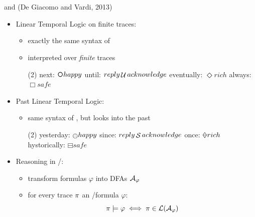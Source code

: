 \documentclass{beamer}
\begin{document}
\section{\LTLfToDFA}
\begin{frame}{\PLTL and \LTLf (De Giacomo and Vardi, 2013)}
	\begin{itemize}
		\item Linear Temporal Logic on finite traces: \LTLf
			\begin{itemize}
				\item exactly the same syntax of \LTL
				\item interpreted over \textit{finite} traces
	
			\begin{tasks}[counter-format = -](2)
				\task next: $\Next happy$
				\task until: $reply \mathop{\mathcal{U}} acknowledge$
				\task eventually: $\Diamond rich$
				\task always: $\Box safe$
			\end{tasks}
			
			\end{itemize}

		\item Past Linear Temporal Logic: \PLTL
			\begin{itemize}
				\item same syntax of \LTLf, but looks into the past
	
				\begin{tasks}[counter-format = -](2)
					\task yesterday: $\Yesterday happy$
					\task since: $reply \mathop{\mathcal{S}} acknowledge$
					\task once: $\Once rich$
					\task hystorically: $\boxminus safe$					
				\end{tasks}
			\end{itemize}
		
		\item Reasoning in \LTLf/\PLTL:
			\begin{itemize}
				\item transform formulas $\varphi$ into DFAs $\mathcal{A}_\varphi$
				\item for every trace $\pi$ an \LTLf/\PLTL formula $\varphi$: \[\pi \models \varphi \iff \pi \in \mathcal{L}(\mathcal{A}_\varphi)\]
			\end{itemize}
	\end{itemize}
\end{frame}
\end{document}
